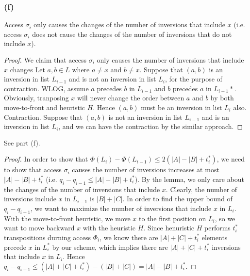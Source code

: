 \subsubsection*{(f)}

\begin{lemma}
    Access $\sigma_i$ only causes the changes of 
    the number of inversions that include $x$ 
    (i.e. access $\sigma_i$ does not cause the changes of 
    the number of inversions that do not include $x$).
\end{lemma}

\begin{proof}
    We claim that access $\sigma_i$ only causes the number of inversions that include $x$ changes
    Let $a,b \in L$ where $a \neq x$ and $b \neq x$.
    Suppose that $(a,b)$ is an inversion in list $L_{i-1}$ and is not an inversion in list $L_i$,
    for the purpose of contraction.
    WLOG, assume $a$ precedes $b$ in $L_{i-1}$ and $b$ precedes $a$ in $L_{i-1}*$.
    Obviously, tranposing $x$ will never change the order between $a$ and $b$ 
    by both move-to-front and heuristic $H$.
    Hence $(a,b)$ must be an inversion in list $L_i$ also. Contraction.
    Suppose that $(a,b)$ is not an inversion in list $L_{i-1}$ and is an inversion in list $L_i$,
    and we can have the contraction by the similar approach.
\end{proof}

\begin{claim}
    See part (f).
\end{claim}

\begin{proof}
    In order to show that $\Phi(L_i) - \Phi(L_{i-1}) \leq 2 (|A| - |B| + t_i^*)$,
    we need to show that access $\sigma_i$ causes the number of inversions increases 
    at most $|A| - |B| + t_i^*$ (i.e. $q_i - q_{i-1} \leq |A| - |B| + t_i^*$).
    By the lemma, we only care about the changes of the number of inversions that include $x$.
    Clearly, the number of inversions include $x$ in $L_{i-1}$ is $|B| + |C|$.
    In order to find the upper bound of $q_i - q_{i-1}$,
    we want to maximize the number of inversions that include $x$ in $L_i$.
    With the move-to-front heuristic, we move $x$ to the first position on $L_i$,
    so we want to move backward $x$ with the heuristic $H$.
    Since henuristic $H$ performs $t_i^*$ transpositions durning access $\Phi_i$,
    we know there are $|A| + |C| + t_i^*$ elements precede $x$ in $L_i^*$ by our scheme,
    which implies there are $|A| + |C| + t_i^*$ inversions that include $x$ in $L_i$.
    Hence $q_i - q_{i-1} \leq (|A| + |C| + t_i^*) - (|B| + |C|) = |A| - |B| + t_i^*$.
\end{proof}

